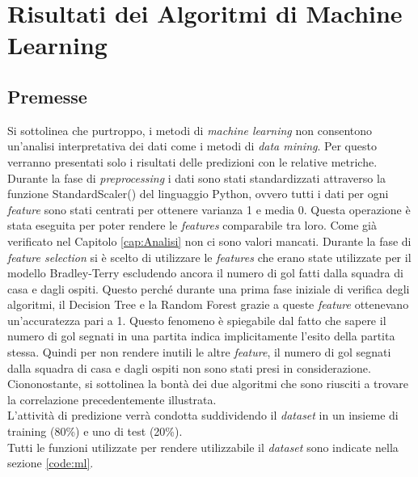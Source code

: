 \chapter{Risultati dei Algoritmi di Machine Learning}
\label{cap:RisML}

\section{Premesse}
Si sottolinea che purtroppo, i metodi di \emph{machine learning} non consentono un'analisi interpretativa dei dati come i metodi di \emph{data mining}. Per questo verranno presentati solo i risultati delle predizioni con le relative metriche.\\
Durante la fase di \emph{preprocessing} i dati sono stati standardizzati attraverso la funzione \textsf{StandardScaler()} del linguaggio Python, ovvero tutti i dati per ogni \emph{feature} sono stati centrati per ottenere varianza 1 e media 0. Questa operazione è stata eseguita per poter rendere le \emph{features} comparabile tra loro. Come già verificato nel Capitolo \ref{cap:Analisi} non ci sono valori mancati. Durante la fase di \emph{feature selection} si è scelto di utilizzare le \emph{features} che erano state utilizzate per il modello Bradley-Terry escludendo ancora il numero di gol fatti dalla squadra di casa e dagli ospiti. Questo perché durante una prima fase iniziale di verifica degli algoritmi, il Decision Tree e la Random Forest grazie a queste \emph{feature} ottenevano un’accuratezza pari a 1. Questo fenomeno è spiegabile dal fatto che sapere il numero di gol segnati in una partita indica implicitamente l'esito della partita stessa. Quindi per non rendere inutili le altre \emph{feature}, il numero di gol segnati dalla squadra di casa e dagli ospiti non sono stati presi in considerazione. Ciononostante, si sottolinea la bontà dei due algoritmi che sono riusciti a trovare la correlazione precedentemente illustrata. \\
L'attività di predizione verrà condotta suddividendo il \emph{dataset} in un insieme di training (80\%) e uno di test (20\%).\\
Tutti le funzioni utilizzate per rendere utilizzabile il \emph{dataset} sono indicate nella sezione \ref{code:ml}.

